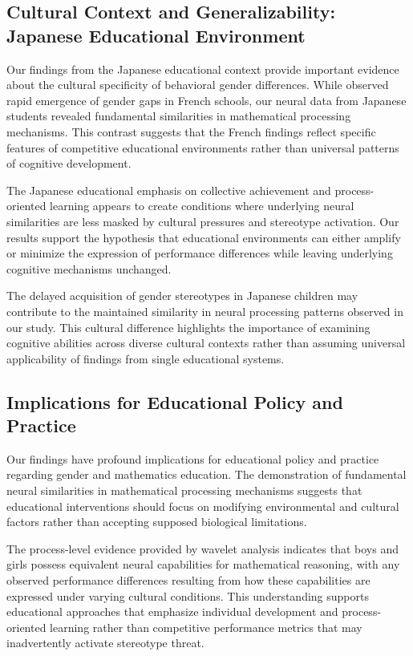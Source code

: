 \documentclass[pdflatex,reference]{sn-jnl}%
\theoremstyle{thmstyleone}%
\theoremstyle{thmstyletwo}%
\theoremstyle{thmstylethree}%
\begin{document}
\subsection{Cultural Context and Generalizability: Japanese Educational Environment}
Our findings from the Japanese educational context provide important evidence about the cultural specificity of behavioral gender differences. While \cite{martinot2025mathematical} observed rapid emergence of gender gaps in French schools, our neural data from Japanese students revealed fundamental similarities in mathematical processing mechanisms. This contrast suggests that the French findings reflect specific features of competitive educational environments rather than universal patterns of cognitive development.

The Japanese educational emphasis on collective achievement and process-oriented learning appears to create conditions where underlying neural similarities are less masked by cultural pressures and stereotype activation. Our results support the hypothesis that educational environments can either amplify or minimize the expression of performance differences while leaving underlying cognitive mechanisms unchanged.

The delayed acquisition of gender stereotypes in Japanese children \cite{tatsuno2022development} may contribute to the maintained similarity in neural processing patterns observed in our study. This cultural difference highlights the importance of examining cognitive abilities across diverse cultural contexts rather than assuming universal applicability of findings from single educational systems.


\subsection{Implications for Educational Policy and Practice}
Our findings have profound implications for educational policy and practice regarding gender and mathematics education. The demonstration of fundamental neural similarities in mathematical processing mechanisms suggests that educational interventions should focus on modifying environmental and cultural factors rather than accepting supposed biological limitations.

The process-level evidence provided by wavelet analysis indicates that boys and girls possess equivalent neural capabilities for mathematical reasoning, with any observed performance differences resulting from how these capabilities are expressed under varying cultural conditions. This understanding supports educational approaches that emphasize individual development and process-oriented learning rather than competitive performance metrics that may inadvertently activate stereotype threat.
\end{document}
